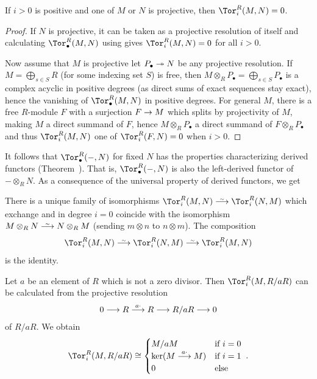 \documentclass[a4paper,parskip=half,numbers=enddot, DIV=12]{scrreprt}
\begin{document}
\begin{fact}
	If $i>0$ is positive and one of $M$ or $N$ is projective, then $\Tor_i^R(M,N)=0$.
\end{fact}
\begin{proof}
	If $N$ is projective, it can be taken as a projective resolution of itself and calculating $\Tor_\bullet^R(M,N)$ using  gives $\Tor_i^R(M,N)=0$ for all $i>0$. 
	
	Now assume that $M$ is projective let $P_\bullet \epimorphism N$ be any projective resolution. If $M=\bigoplus_{s\in S}R$ (for some indexing set $S$) is free, then $M\otimes_RP_\bullet=\bigoplus_{s\in S}P_\bullet$ is a complex acyclic in positive degrees (as direct sums of exact sequences stay exact), hence the vanishing of $\Tor_\bullet^R(M,N)$ in positive degrees. For general $M$, there is a free $R$-module $F$ with a surjection $F\morphism M$ which splits by projectivity of $M$, making $M$ a direct summand of $F$, hence $M\otimes_RP_\bullet$ a direct summand of $F\otimes_RP_\bullet$ and thus $\Tor_i^R(M,N)$ one of $\Tor_i^R(F,N)=0$ when $i>0$. 
\end{proof}
It follows that $\Tor_\bullet^R(-,N)$ for fixed $N$ has the properties characterizing derived functors (Theorem~). That is, $\Tor_\bullet^R(-,N)$ is also the left-derived functor of $-\otimes_RN$. As a consequence of the universal property of derived functors, we get
\begin{prop}
	There is a unique family of isomorphisms $\Tor_i^R(M,N)\isomorphism\Tor_i^R(N,M)$ which exchange  and  in degree $i=0$ coincide with the isomorphism $M\otimes_RN\isomorphism N\otimes_RM$ (sending $m\otimes n$ to $n\otimes m$). The composition
	\begin{align*}
		\Tor_i^R(M,N)\isomorphism \Tor_i^R(N,M)\isomorphism\Tor_i^R(M,N)
	\end{align*}
	is the identity.
\end{prop}
\begin{example}
	Let $a$ be an element of $R$ which is not a zero divisor. Then  $\Tor_i^R(M,R/aR)$ can be calculated from the projective resolution 
	\begin{align*}
		0\morphism R\morphism[a\cdot ]R\morphism R/aR\morphism 0
	\end{align*}
	of $R/aR$. We obtain
	\begin{align*}
		\Tor_i^R(M,R/aR)\cong\begin{cases}
			M/aM & \text{if }i=0\\
			\ker(M\morphism[a\cdot ]M) & \text{if }i=1\\
			0 & \text{else}
		\end{cases}\;.
	\end{align*}
\end{example}
\end{document}
